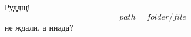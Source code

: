 \documentclass[12pt]{article}
\begin{document}
Руддщ!
\begin{equation}
path=folder/file
\end{equation}
не ждали, а ннада?
\end{document}
